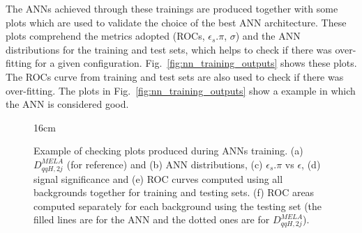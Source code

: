 The ANNs achieved through these trainings are produced together with some plots which are used to validate the choice of the best ANN architecture. These plots comprehend the metrics adopted (ROCs, $\epsilon_{s}.\pi$, $\sigma$) and the ANN distributions for the training and test sets, which helps to check if there was over-fitting for a given configuration. Fig.~\ref{fig:nn_training_outputs} shows these plots. The ROCs curve from training and test sets are also used to check if there was over-fitting. The plots in Fig.~\ref{fig:nn_training_outputs} show a example in which the ANN is considered good.

\begin{figure}[hbtp]{16cm}
	\caption{Example of checking plots produced during ANNs training. (a) $D_{qqH, 2j}^{MELA}$ (for reference) and (b) ANN distributions, (c) $\epsilon_{s}.\pi$ vs $\epsilon$, (d) signal significance and (e) ROC curves computed using all backgrounds together for training and testing sets. (f) ROC areas computed separately for each background using the testing set (the filled lines are for the ANN and the dotted ones are for $D_{qqH, 2j}^{MELA}$).}
	\centering		
	\subfloat[]{
}
\end{figure}
